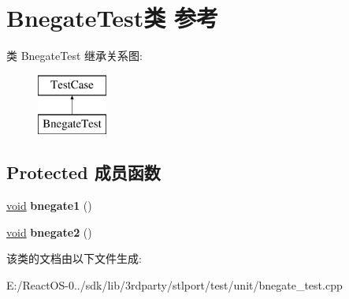 \hypertarget{class_bnegate_test}{}\section{Bnegate\+Test类 参考}
\label{class_bnegate_test}
类 Bnegate\+Test 继承关系图\+:\begin{figure}[H]
\begin{center}
\leavevmode
\includegraphics[height=2.000000cm]{class_bnegate_test}
\end{center}
\end{figure}
\subsection*{Protected 成员函数}
\begin{DoxyCompactItemize}
\item 
\mbox{\label{class_bnegate_test_ab17ce39af2603cb02fc06c7ea170278e}} 
\hyperlink{interfacevoid}{void} {\bfseries bnegate1} ()
\item 
\mbox{\label{class_bnegate_test_a4f32966cac5bff36b76a6b80a6fa906e}} 
\hyperlink{interfacevoid}{void} {\bfseries bnegate2} ()
\end{DoxyCompactItemize}


该类的文档由以下文件生成\+:\begin{DoxyCompactItemize}
\item 
E\+:/\+React\+O\+S-\/0../sdk/lib/3rdparty/stlport/test/unit/bnegate\+\_\+test.\+cpp\end{DoxyCompactItemize}
